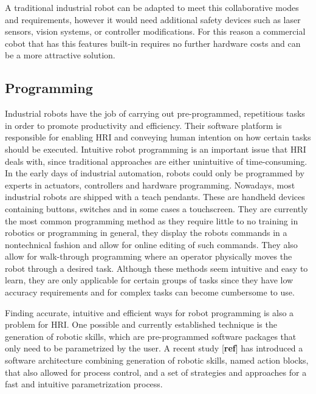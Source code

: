 
\par A traditional industrial robot can be adapted to meet this collaborative modes and requirements, however it would need additional safety devices such as laser sensors, vision systems, or controller modifications. For this reason a commercial cobot that has this features built-in requires no further hardware costs and can be a more attractive solution.

\subsection{Programming}

\par Industrial robots have the job of carrying out pre-programmed, repetitious tasks in order to promote productivity and efficiency. Their software platform is responsible for enabling HRI and conveying human intention on how certain tasks should be executed. Intuitive robot programming is an important issue that HRI deals with, since traditional approaches are either unintuitive of time-consuming. In the early days of industrial automation, robots could only be programmed by experts in actuators, controllers and hardware programming. Nowadays, most industrial robots are shipped with a teach pendants. These are handheld devices containing buttons, switches and in some cases a touchscreen. They are currently the most common programming method as they require little to no training in robotics or programming in general, they display the robots commands in a nontechnical fashion and allow for online editing of such commands. They also allow for walk-through programming where an operator physically moves the robot through a desired task. Although these methods seem intuitive and easy to learn, they are only applicable for certain groups of tasks since they have low accuracy requirements and for complex tasks can become cumbersome to use.

\par Finding accurate, intuitive and efficient ways for robot programming is also a problem for HRI. One possible and currently established technique is the generation of robotic skills, which are pre-programmed software packages that only need to be parametrized by the user. A recent study [\textbf{ref}] has introduced a software architecture combining generation of robotic skills, named action blocks, that also allowed for process control, and a set of strategies and approaches for a fast and intuitive parametrization process.

